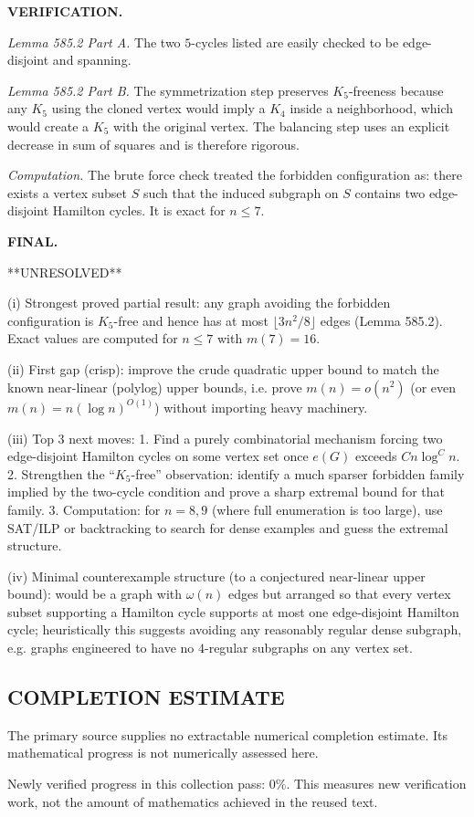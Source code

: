 \bigskip
\noindent\textbf{VERIFICATION.}

\emph{Lemma 585.2 Part A.} The two $5$-cycles listed are easily checked to be edge-disjoint and spanning.

\emph{Lemma 585.2 Part B.} The symmetrization step preserves $K_5$-freeness because any $K_5$ using the cloned vertex would imply a $K_4$ inside a neighborhood, which would create a $K_5$ with the original vertex.
The balancing step uses an explicit decrease in sum of squares and is therefore rigorous.

\emph{Computation.} The brute force check treated the forbidden configuration as: there exists a vertex subset $S$ such that the induced subgraph on $S$ contains two edge-disjoint Hamilton cycles. It is exact for $n\le 7$.

\bigskip
\noindent\textbf{FINAL.}

**UNRESOLVED**

(i) Strongest proved partial result: any graph avoiding the forbidden configuration is $K_5$-free and hence has at most $\lfloor 3n^2/8\rfloor$ edges (Lemma 585.2). Exact values are computed for $n\le 7$ with $m(7)=16$.

(ii) First gap (crisp): improve the crude quadratic upper bound to match the known near-linear (polylog) upper bounds, i.e. prove $m(n)=o(n^2)$ (or even $m(n)=n(\log n)^{O(1)}$) without importing heavy machinery.

(iii) Top 3 next moves:
1. Find a purely combinatorial mechanism forcing two edge-disjoint Hamilton cycles on some vertex set once $e(G)$ exceeds $Cn\log^C n$.
2. Strengthen the ``$K_5$-free'' observation: identify a much sparser forbidden family implied by the two-cycle condition and prove a sharp extremal bound for that family.
3. Computation: for $n=8,9$ (where full enumeration is too large), use SAT/ILP or backtracking to search for dense examples and guess the extremal structure.

(iv) Minimal counterexample structure (to a conjectured near-linear upper bound): would be a graph with $\omega(n)$ edges but arranged so that every vertex subset supporting a Hamilton cycle supports at most one edge-disjoint Hamilton cycle; heuristically this suggests avoiding any reasonably regular dense subgraph, e.g. graphs engineered to have no $4$-regular subgraphs on any vertex set.




\subsection*{COMPLETION ESTIMATE}
The primary source supplies no extractable numerical completion estimate. Its mathematical progress is not numerically assessed here.

Newly verified progress in this collection pass: $0\%$. This measures new verification work, not the amount of mathematics achieved in the reused text.
